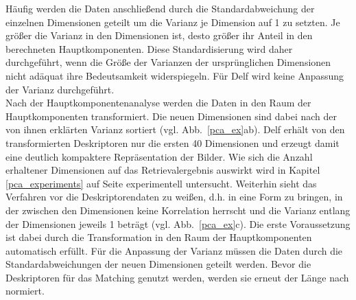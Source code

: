 Häufig werden die Daten anschließend durch die Standardabweichung der einzelnen Dimensionen geteilt um die Varianz je Dimension auf 1 zu setzten. Je größer die Varianz in den Dimensionen ist, desto größer ihr Anteil in den berechneten Hauptkomponenten. Diese Standardisierung wird daher durchgeführt, wenn die Größe der Varianzen der ursprünglichen Dimensionen nicht adäquat ihre Bedeutsamkeit widerspiegeln. Für Delf wird keine Anpassung der Varianz durchgeführt.
\\
Nach der Hauptkomponentenanalyse werden die Daten in den Raum der Hauptkomponenten transformiert. Die neuen Dimensionen sind dabei nach der von ihnen erklärten Varianz sortiert (vgl. Abb.~\ref{pca_ex}ab). Delf erhält von den transformierten Deskriptoren nur die ersten 40 Dimensionen und erzeugt damit eine deutlich kompaktere Repräsentation der Bilder. Wie sich die Anzahl erhaltener Dimensionen auf das Retrievalergebnis auswirkt wird in Kapitel \ref{pca_experiments} auf Seite \pageref{pca_experiments} experimentell untersucht. Weiterhin sieht das Verfahren vor die Deskriptorendaten zu weißen, d.h. in eine Form zu bringen, in der zwischen den Dimensionen keine Korrelation herrscht und die Varianz entlang der Dimensionen jeweils 1 beträgt (vgl. Abb.~\ref{pca_ex}c). Die erste Voraussetzung ist dabei durch die Transformation in den Raum der Hauptkomponenten automatisch erfüllt. Für die Anpassung der Varianz müssen die Daten durch die Standardabweichungen der neuen Dimensionen geteilt werden. Bevor die Deskriptoren für das Matching genutzt werden, werden sie erneut der Länge nach normiert.
%
